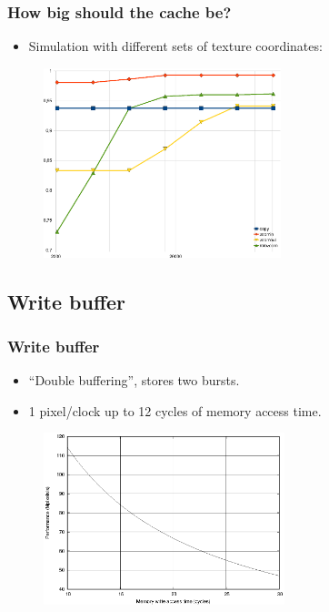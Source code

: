 \documentclass{beamer}
\begin{document}
\frame
{
  \frametitle{How big should the cache be?}
  \begin{itemize}
  \item Simulation with different sets of texture coordinates:
  \end{itemize}
  \begin{figure}[H]
  \includegraphics[height=55mm]{tcresultsgraph.eps}
  \end{figure}
}

\subsection{Write buffer}
\frame
{
  \frametitle{Write buffer}
  \begin{itemize}
  \item ``Double buffering'', stores two bursts.
  \item 1 pixel/clock up to 12 cycles of memory access time.
  \end{itemize}
  \begin{figure}[H]
  \includegraphics[height=50mm]{thwbufperf.eps}
  \end{figure}
}
\end{document}
